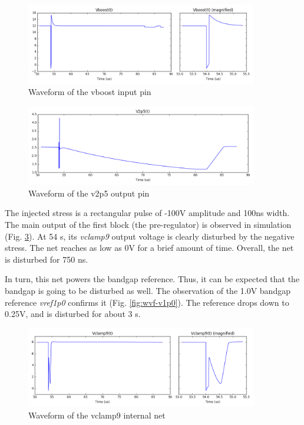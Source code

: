 \begin{figure}[!htbp]
  \centering
  \includegraphics[width=0.9\textwidth]{src/3/figures/vboost.png}
  \caption{Waveform of the vboost input pin}
  \label{fig:wvf-vboost}
\end{figure}

\begin{figure}[!htbp]
  \centering
  \includegraphics[width=0.9\textwidth]{src/3/figures/v2p5.png}
  \caption{Waveform of the v2p5 output pin}
  \label{fig:wvf-v2p5}
\end{figure}

The injected stress is a rectangular pulse of -100V amplitude and 100ns width.
The main output of the first block (the pre-regulator) is observed in simulation (Fig. \ref{fig:wvf-vclamp9}).
At 54 \textmugreek{}s, its \textit{vclamp9} output voltage is clearly disturbed by the negative stress.
The net reaches as low as 0V for a brief amount of time.
Overall, the net is disturbed for 750 ns.

In turn, this net powers the bandgap reference.
Thus, it can be expected that the bandgap is going to be disturbed as well.
The observation of the 1.0V bandgap reference \textit{vref1p0} confirms it (Fig. \ref{fig:wvf-v1p0}).
The reference drops down to 0.25V, and is disturbed for about 3 \textmugreek{}s.

\begin{figure}[!htbp]
  \centering
  \includegraphics[width=0.9\textwidth]{src/3/figures/vclamp9.png}
  \caption{Waveform of the vclamp9 internal net}
  \label{fig:wvf-vclamp9}
\end{figure}

